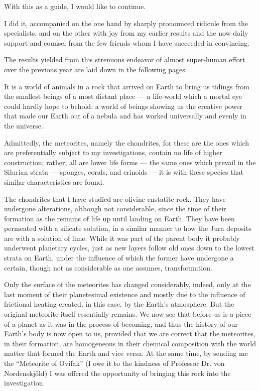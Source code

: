 \documentclass[a4paper, 12pt, oneside]{article}
\begin{document}
With this as a guide, I would like to continue.

I did it, accompanied on the one hand by sharply pronounced ridicule from the specialists, and on the other with joy from my earlier results and the now daily support and counsel from the few friends whom I have succeeded in convincing.

The results yielded from this strenuous endeavor of almost super-human effort over the previous year are laid down in the following pages.

It is a world of animals in a rock that arrived on Earth to bring us tidings from the smallest beings of a most distant place --- a life-world which a mortal eye could hardly hope to behold: a world of beings showing us the creative power that made our Earth out of a nebula and has worked universally and evenly in the universe.

Admittedly, the meteorites, namely the chondrites, for these are the ones which are preferentially subject to my investigations, contain no life of higher construction; rather, all are lower life forms --- the same ones which prevail in the Silurian strata --- sponges, corals, and crinoids --- it is with these species that similar characteristics are found.

The chondrites that I have studied are olivine enstatite rock. They have undergone alterations, although not considerable, since the time of their formation as the remains of life up until landing on Earth. They have been permeated with a silicate solution, in a similar manner to how the Jura deposits are with a solution of lime. While it was part of the parent body it probably underwent planetary cycles, just as new layers follow old ones down to the lowest strata on Earth, under the influence of which the former have undergone a certain, though not as considerable as one assumes, transformation.

Only the surface of the meteorites has changed considerably, indeed, only at the last moment of their planetesimal existence and mostly due to the influence of frictional heating created, in this case, by the Earth's atmosphere. But the original meteorite itself essentially remains. We now see that before us is a piece of a planet as it was in the process of becoming, and thus the history of our Earth's body is now open to us, provided that we are correct that the meteorites, in their formation, are homogeneous in their chemical composition with the world matter that formed the Earth and vice versa. At the same time, by sending me the ``Meteorite of Ovifak'' (I owe it to the kindness of Professor Dr. von Nordenskjöld) I was offered the opportunity of bringing this rock into the investigation.
\end{document}
